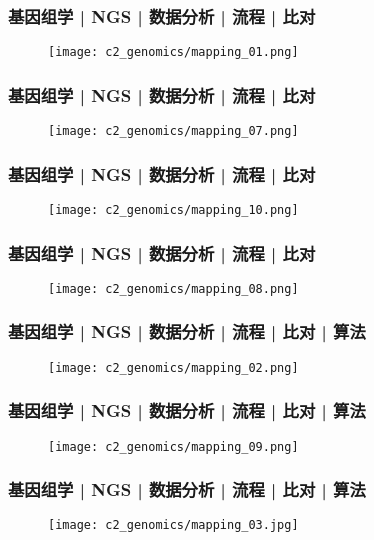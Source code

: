 \begin{frame}
  \frametitle{基因组学 | NGS | 数据分析 | 流程 | 比对}
  \begin{figure}
    \centering
    \texttt{[image: c2\_genomics/mapping\_01.png]}
  \end{figure}
\end{frame}

\begin{frame}
  \frametitle{基因组学 | NGS | 数据分析 | 流程 | 比对}
  \begin{figure}
    \centering
    \texttt{[image: c2\_genomics/mapping\_07.png]}
  \end{figure}
\end{frame}

\begin{frame}
  \frametitle{基因组学 | NGS | 数据分析 | 流程 | 比对}
  \begin{figure}
    \centering
    \texttt{[image: c2\_genomics/mapping\_10.png]}
  \end{figure}
\end{frame}

\begin{frame}
  \frametitle{基因组学 | NGS | 数据分析 | 流程 | 比对}
  \begin{figure}
    \centering
    \texttt{[image: c2\_genomics/mapping\_08.png]}
  \end{figure}
\end{frame}

\begin{frame}
  \frametitle{基因组学 | NGS | 数据分析 | 流程 | 比对 | 算法}
  \begin{figure}
    \centering
    \texttt{[image: c2\_genomics/mapping\_02.png]}
  \end{figure}
\end{frame}

\begin{frame}
  \frametitle{基因组学 | NGS | 数据分析 | 流程 | 比对 | 算法}
  \begin{figure}
    \centering
    \texttt{[image: c2\_genomics/mapping\_09.png]}
  \end{figure}
\end{frame}

\begin{frame}
  \frametitle{基因组学 | NGS | 数据分析 | 流程 | 比对 | 算法}
  \begin{figure}
    \centering
    \texttt{[image: c2\_genomics/mapping\_03.jpg]}
  \end{figure}
\end{frame}

